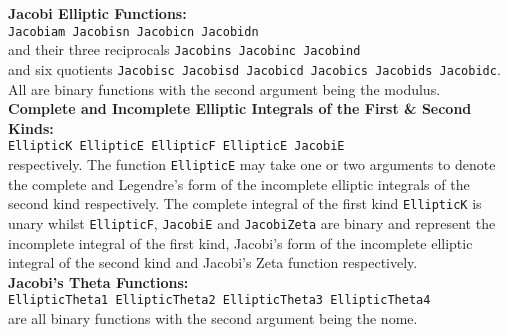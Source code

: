\hypertarget{operator:Jacobiam}{}
\hypertarget{operator:Jacobisn}{}
\hypertarget{operator:Jacobicn}{}
\hypertarget{operator:Jacobidn}{}
\hypertarget{operator:Jacobins}{}
\hypertarget{operator:Jacobinc}{}
\hypertarget{operator:Jacobind}{}
\hypertarget{operator:Jacobisc}{}
\hypertarget{operator:Jacobisd}{}
\hypertarget{operator:Jacobics}{}
\hypertarget{operator:Jacobicd}{}
\hypertarget{operator:Jacobidc}{}
\hypertarget{operator:Jacobids}{}
\hypertarget{operator:JacobiZeta}{}
\hypertarget{operator:JacobiE}{}
\hypertarget{operator:EllipticK}{}
\hypertarget{operator:EllipticE}{}
\hypertarget{operator:EllipticF}{}
\hypertarget{operator:EllipticTheta1}{}
\hypertarget{operator:EllipticTheta2}{}
\hypertarget{operator:EllipticTheta3}{}
\hypertarget{operator:EllipticTheta4}{}
\textbf{Jacobi Elliptic Functions:}\\
\texttt{Jacobiam Jacobisn Jacobicn Jacobidn}\\
and their three reciprocals \texttt{Jacobins Jacobinc Jacobind}\\
 and six quotients 
\texttt{Jacobisc Jacobisd Jacobicd Jacobics Jacobids Jacobidc}.\\
All are binary functions with the second argument being the modulus.\\
\textbf{Complete and Incomplete Elliptic Integrals of the First \& Second Kinds:}\\
\texttt{EllipticK EllipticE EllipticF  EllipticE  JacobiE}\\ 
respectively.  The function \texttt{EllipticE} may take one or two arguments to
denote the complete and Legendre's form of the incomplete elliptic integrals of
the second kind respectively. The complete integral of the first kind
\texttt{EllipticK} is unary whilst \texttt{EllipticF}, \texttt{JacobiE} and
\texttt{JacobiZeta} are
binary and represent the incomplete integral of the first kind, Jacobi's
form of the incomplete elliptic integral of the second kind and Jacobi's
Zeta function respectively.\\
\textbf{Jacobi's Theta Functions:}\\
\texttt{EllipticTheta1 EllipticTheta2 EllipticTheta3 EllipticTheta4}\\
are all binary functions with the second argument being the nome.\\

